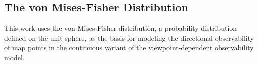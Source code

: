 \subsection{The von Mises-Fisher Distribution}

This work uses the von Mises-Fisher distribution, a probability distribution defined on the unit sphere, as the basis for modeling the directional observability of map points in the continuous variant of the viewpoint-dependent observability model.